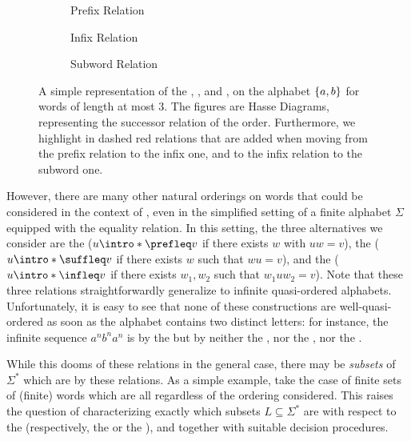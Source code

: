 \begin{figure}
    \centering
    \begin{subfigure}[t]{0.48\textwidth}
    	\centering
    	
    	\caption{Prefix Relation}
   	\end{subfigure}%
   	\hfill%
   	\begin{subfigure}[t]{0.48\textwidth}
   		\centering
   		
   		\caption{Infix Relation}
   	\end{subfigure}
   	\begin{subfigure}[t]{0.48\textwidth}
   		\centering
   		
   		\caption{Subword Relation}
   	\end{subfigure}
   	
   	\caption{A simple representation of the ,
        ,
        and ,
        on the alphabet $\{ a,b \}$ for words of
        length at most $3$. The figures are Hasse Diagrams,
        representing the successor relation of the order.
        Furthermore, we highlight in dashed red relations that are added
        when moving from the prefix relation to the infix one,
        and to the infix relation to the subword one.}
    \label{word-embeddings:fig}
\end{figure}

\AP However, there are many other natural orderings on words that could be
considered in the context of , even in the simplified
setting of a finite alphabet $\Sigma$ equipped with the equality relation. In
this setting, the three alternatives we consider are the  ($u \intro*\prefleq v$ if there exists $w$ with $uw = v$), the
 ($u \intro*\suffleq v$ if there exists $w$ such that
$wu = v$), and the  ($u \intro*\infleq v$ if there exists
$w_1,w_2$ such that $w_1 u w_2 = v$). Note that these three relations
straightforwardly generalize to infinite quasi-ordered alphabets.
Unfortunately, it is easy to see that none of these constructions are 
well-quasi-ordered as soon as the alphabet contains two distinct letters:
for instance, the infinite sequence $a^n b^n a^n$ is  by
the  but by neither the , nor the
, nor the .

\AP While this dooms  of these
relations in the general case, there may be \emph{subsets} of $\Sigma^*$ which
are  by these relations. As a simple example, take the
case of finite sets of (finite) words which are all 
regardless of the ordering considered. This raises the question of
characterizing exactly which subsets $L \subseteq \Sigma^*$ are
 with respect to the  (respectively,
the  or the ), and together with
suitable decision procedures.

